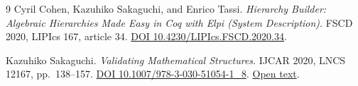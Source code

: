 \documentclass{article}
\begin{document}
\begin{thebibliography}{9}
Cyril Cohen, Kazuhiko Sakaguchi, and Enrico Tassi.
\emph{Hierarchy Builder: Algebraic Hierarchies Made Easy in Coq with Elpi
(System Description)}.
FSCD 2020, LIPIcs 167, article 34.
\href{https://doi.org/10.4230/LIPIcs.FSCD.2020.34}{DOI 10.4230/LIPIcs.FSCD.2020.34}.

Kazuhiko Sakaguchi.
\emph{Validating Mathematical Structures}.
IJCAR 2020, LNCS 12167, pp.~138--157.
\href{https://doi.org/10.1007/978-3-030-51054-1_8}{DOI 10.1007/978-3-030-51054-1\_8}.
\href{https://pmc.ncbi.nlm.nih.gov/articles/PMC7324068/}{Open text}.
\end{thebibliography}
\end{document}
